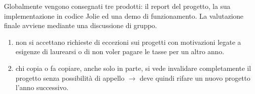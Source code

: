 Globalmente vengono consegnati tre prodotti: il report del progetto, la sua implementazione in codice Jolie ed una demo di funzionamento. La valutazione finale avviene mediante una discussione di gruppo.
\begin{tcolorbox}[colback=yellow!20!white,colframe=yellow!75!black,title=\textbf{N.B.}]
    \begin{enumerate}
        \item non si accettano richieste di eccezioni sui progetti con motivazioni legate a esigenze di laurearsi o di non voler pagare le tasse per un altro anno.
        \item chi copia o fa copiare, anche solo in parte, si vede invalidare completamente il progetto senza possibilità di appello $\rightarrow$ deve quindi rifare un nuovo progetto l'anno successivo.
    \end{enumerate}
\end{tcolorbox}

